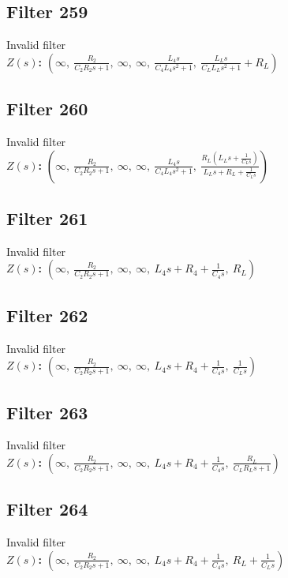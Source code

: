 \documentclass{article}
\begin{document}
\subsection*{Filter 259}
Invalid filter \\ 
\textbf{$Z(s)$:} $\left( \infty, \  \frac{R_{2}}{C_{2} R_{2} s + 1}, \  \infty, \  \infty, \  \frac{L_{4} s}{C_{4} L_{4} s^{2} + 1}, \  \frac{L_{L} s}{C_{L} L_{L} s^{2} + 1} + R_{L}\right)$ \\ 
\subsection*{Filter 260}
Invalid filter \\ 
\textbf{$Z(s)$:} $\left( \infty, \  \frac{R_{2}}{C_{2} R_{2} s + 1}, \  \infty, \  \infty, \  \frac{L_{4} s}{C_{4} L_{4} s^{2} + 1}, \  \frac{R_{L} \left(L_{L} s + \frac{1}{C_{L} s}\right)}{L_{L} s + R_{L} + \frac{1}{C_{L} s}}\right)$ \\ 
\subsection*{Filter 261}
Invalid filter \\ 
\textbf{$Z(s)$:} $\left( \infty, \  \frac{R_{2}}{C_{2} R_{2} s + 1}, \  \infty, \  \infty, \  L_{4} s + R_{4} + \frac{1}{C_{4} s}, \  R_{L}\right)$ \\ 
\subsection*{Filter 262}
Invalid filter \\ 
\textbf{$Z(s)$:} $\left( \infty, \  \frac{R_{2}}{C_{2} R_{2} s + 1}, \  \infty, \  \infty, \  L_{4} s + R_{4} + \frac{1}{C_{4} s}, \  \frac{1}{C_{L} s}\right)$ \\ 
\subsection*{Filter 263}
Invalid filter \\ 
\textbf{$Z(s)$:} $\left( \infty, \  \frac{R_{2}}{C_{2} R_{2} s + 1}, \  \infty, \  \infty, \  L_{4} s + R_{4} + \frac{1}{C_{4} s}, \  \frac{R_{L}}{C_{L} R_{L} s + 1}\right)$ \\ 
\subsection*{Filter 264}
Invalid filter \\ 
\textbf{$Z(s)$:} $\left( \infty, \  \frac{R_{2}}{C_{2} R_{2} s + 1}, \  \infty, \  \infty, \  L_{4} s + R_{4} + \frac{1}{C_{4} s}, \  R_{L} + \frac{1}{C_{L} s}\right)$ \\ 
\end{document}

